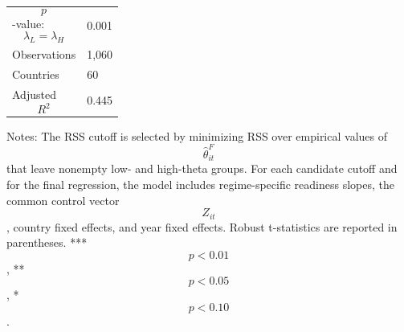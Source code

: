 \begin{table}[H]
\begin{threeparttable}
\begin{tabularx}{\textwidth}{lY}
$$p$$-value: $$\lambda_L=\lambda_H$$ & 0.001 \\
Observations & 1,060 \\
Countries & 60 \\
Adjusted $$R^2$$ & 0.445 \\
\bottomrule
\end{tabularx}
\begin{tablenotes}[flushleft]\footnotesize
\item Notes: The RSS cutoff is selected by minimizing RSS over empirical values of $$\widehat{\theta}^{F}_{it}$$ that leave nonempty low- and high-theta groups. For each candidate cutoff and for the final regression, the model includes regime-specific readiness slopes, the common control vector $$Z_{it}$$, country fixed effects, and year fixed effects. Robust t-statistics are reported in parentheses. *** $$p<0.01$$, ** $$p<0.05$$, * $$p<0.10$$.
\end{tablenotes}
\end{threeparttable}
\end{table}
